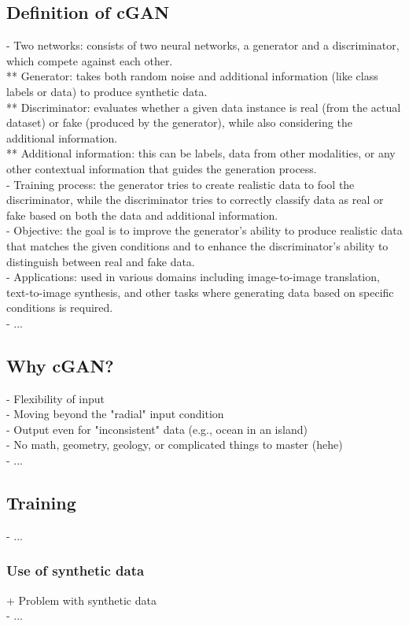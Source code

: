 \subsection{Definition of cGAN}
- Two networks: consists of two neural networks, a generator and a discriminator, which compete against each other. \\
** Generator: takes both random noise and additional information (like class labels or data) to produce synthetic data. \\
** Discriminator: evaluates whether a given data instance is real (from the actual dataset) or fake (produced by the generator), while also considering the additional information. \\
** Additional information: this can be labels, data from other modalities, or any other contextual information that guides the generation process. \\
- Training process: the generator tries to create realistic data to fool the discriminator, while the discriminator tries to correctly classify data as real or fake based on both the data and additional information. \\
- Objective: the goal is to improve the generator's ability to produce realistic data that matches the given conditions and to enhance the discriminator's ability to distinguish between real and fake data. \\
- Applications: used in various domains including image-to-image translation, text-to-image synthesis, and other tasks where generating data based on specific conditions is required. \\
- ...

\subsection{Why cGAN?}
- Flexibility of input \\
- Moving beyond the "radial" input condition \\
- Output even for "inconsistent" data (e.g., ocean in an island) \\
- No math, geometry, geology, or complicated things to master (hehe) \\
- ... 

\subsection{Training}
- ...

\subsubsection{Use of synthetic data}
+ Problem with synthetic data \\
- ...

